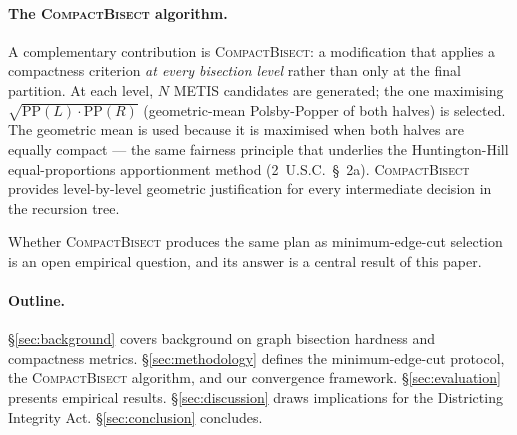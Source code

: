 \paragraph{The \textsc{CompactBisect} algorithm.}
A complementary contribution is \textsc{CompactBisect}: a modification that
applies a compactness criterion \emph{at every bisection level} rather than
only at the final partition. At each level, $N$ METIS candidates are
generated; the one maximising $\sqrt{\mathrm{PP}(L) \cdot \mathrm{PP}(R)}$
(geometric-mean Polsby-Popper of both halves) is selected. The geometric
mean is used because it is maximised when both halves are equally compact ---
the same fairness principle that underlies the Huntington-Hill equal-proportions
apportionment method (2~U.S.C.~\S~2a). \textsc{CompactBisect} provides
level-by-level geometric justification for every intermediate decision in
the recursion tree.

Whether \textsc{CompactBisect} produces the same plan as minimum-edge-cut
selection is an open empirical question, and its answer is a central result
of this paper.

\paragraph{Outline.}
\S\ref{sec:background} covers background on graph bisection hardness and
compactness metrics. \S\ref{sec:methodology} defines the minimum-edge-cut
protocol, the \textsc{CompactBisect} algorithm, and our convergence
framework. \S\ref{sec:evaluation} presents empirical results.
\S\ref{sec:discussion} draws implications for the Districting Integrity Act.
\S\ref{sec:conclusion} concludes.
